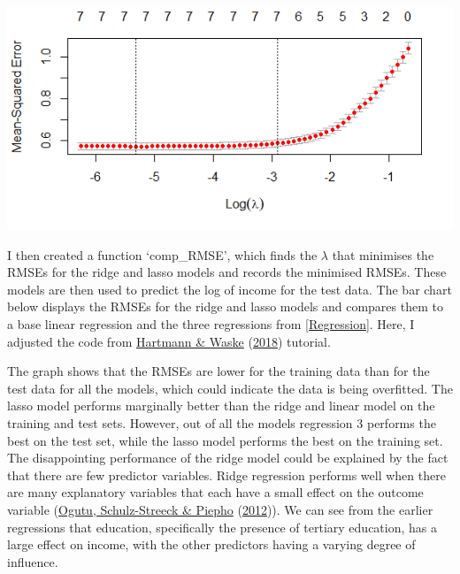 \documentclass[11pt,preprint, authoryear]{elsarticle}
\let\origfigure\figure
\let\endorigfigure\endfigure
\renewenvironment{figure}[1][2] {
    \expandafter\origfigure\expandafter[H]
} {
    \endorigfigure
}
\numberwithin{equation}{section}
\numberwithin{figure}{section}
\numberwithin{table}{section}
\begin{document}
\begin{figure}
\centering
\includegraphics{"images/lasso.png"}
\caption{Lasso Model}
\end{figure}

I then created a function `comp\_RMSE', which finds the \(\lambda\) that
minimises the RMSEs for the ridge and lasso models and records the
minimised RMSEs. These models are then used to predict the log of income
for the test data. The bar chart below displays the RMSEs for the ridge
and lasso models and compares them to a base linear regression and the
three regressions from \ref{Regression}. Here, I adjusted the code from
\protect\hyperlink{ref-ridge}{Hartmann \& Waske}
(\protect\hyperlink{ref-ridge}{2018}) tutorial.

The graph shows that the RMSEs are lower for the training data than for
the test data for all the models, which could indicate the data is being
overfitted. The lasso model performs marginally better than the ridge
and linear model on the training and test sets. However, out of all the
models regression 3 performs the best on the test set, while the lasso
model performs the best on the training set. The disappointing
performance of the ridge model could be explained by the fact that there
are few predictor variables. Ridge regression performs well when there
are many explanatory variables that each have a small effect on the
outcome variable (\protect\hyperlink{ref-lass}{Ogutu, Schulz-Streeck \&
Piepho} (\protect\hyperlink{ref-lass}{2012})). We can see from the
earlier regressions that education, specifically the presence of
tertiary education, has a large effect on income, with the other
predictors having a varying degree of influence.
\end{document}
